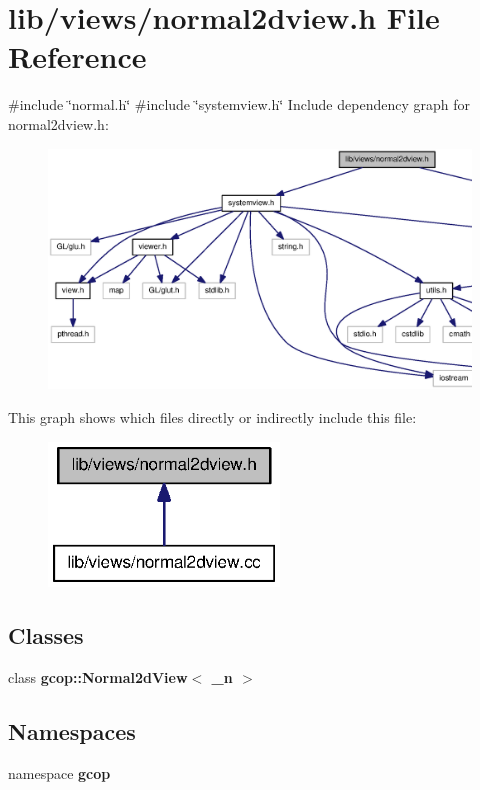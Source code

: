 \section{lib/views/normal2dview.h \-File \-Reference}
\label{normal2dview_8h}
{\ttfamily \#include \char`\"{}normal.\-h\char`\"{}}\*
{\ttfamily \#include \char`\"{}systemview.\-h\char`\"{}}\*
\-Include dependency graph for normal2dview.\-h\-:\nopagebreak
\begin{figure}[H]
\begin{center}
\leavevmode
\includegraphics[width=350pt]{normal2dview_8h__incl}
\end{center}
\end{figure}
\-This graph shows which files directly or indirectly include this file\-:\nopagebreak
\begin{figure}[H]
\begin{center}
\leavevmode
\includegraphics[width=174pt]{normal2dview_8h__dep__incl}
\end{center}
\end{figure}
\subsection*{\-Classes}
\begin{DoxyCompactItemize}
\item 
class {\bf gcop\-::\-Normal2d\-View$<$ \-\_\-n $>$}
\end{DoxyCompactItemize}
\subsection*{\-Namespaces}
\begin{DoxyCompactItemize}
\item 
namespace {\bf gcop}
\end{DoxyCompactItemize}

